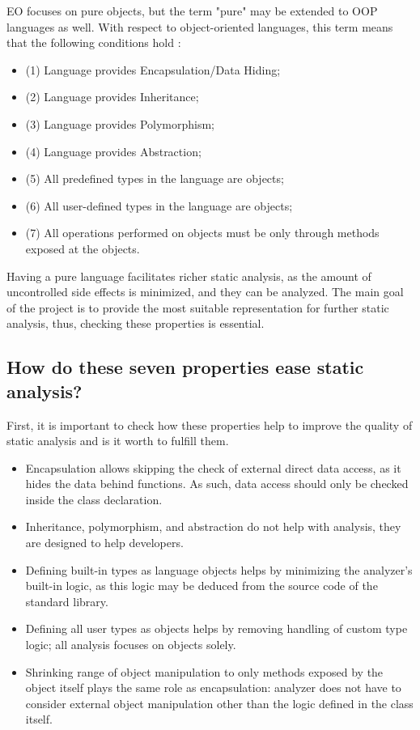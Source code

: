 EO focuses on pure objects, but the term "pure" may be extended to OOP languages as well. With respect to object-oriented languages, this term means that the following conditions hold \cite{making_pure_oop_languages_practical,why_java_is_not_pure}:

\begin{itemize}
    \item (1) Language provides Encapsulation/Data Hiding;
    \item (2) Language provides Inheritance;
    \item (3) Language provides Polymorphism;
    \item (4) Language provides Abstraction;
    \item (5) All predefined types in the language are objects;
    \item (6) All user-defined types in the language are objects;
    \item (7) All operations performed on objects must be only through methods exposed at the objects.
\end{itemize}

Having a pure language facilitates richer static analysis, as the amount of uncontrolled side effects \cite{gifford1986integrating} is minimized, and they can be analyzed. The main goal of the project is to provide the most suitable representation for further static analysis, thus, checking these properties is essential.

\subsection{How do these seven properties ease static analysis?}

First, it is important to check how these properties help to improve the quality of static analysis and is it worth to fulfill them.

\begin{itemize}
  \item Encapsulation allows skipping the check of external direct data access, as it hides the data behind functions. As such, data access should only be checked inside the class declaration.
  \item Inheritance, polymorphism, and abstraction do not help with analysis, they are designed to help developers.
  \item Defining built-in types as language objects helps by minimizing the analyzer's built-in logic, as this logic may be deduced from the source code of the standard library.
  \item Defining all user types as objects helps by removing handling of custom type logic; all analysis focuses on objects solely.
  \item Shrinking range of object manipulation to only methods exposed by the object itself plays the same role as encapsulation: analyzer does not have to consider external object manipulation other than the logic defined in the class itself.
\end{itemize}

